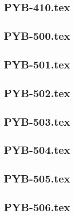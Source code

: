 \renewcommand{\xxexo}{PYB-410.tex} 
\subsection*{\xxexo} 
\graphicspath{{../../exos/python_bases/PYB-410/}}
 
 
\renewcommand{\xxexo}{PYB-500.tex} 
\subsection*{\xxexo} 
\graphicspath{{../../exos/python_bases/PYB-500/}}
 
 
\renewcommand{\xxexo}{PYB-501.tex} 
\subsection*{\xxexo} 
\graphicspath{{../../exos/python_bases/PYB-501/}}
 
 
\renewcommand{\xxexo}{PYB-502.tex} 
\subsection*{\xxexo} 
\graphicspath{{../../exos/python_bases/PYB-502/}}
 
 
\renewcommand{\xxexo}{PYB-503.tex} 
\subsection*{\xxexo} 
\graphicspath{{../../exos/python_bases/PYB-503/}}
 
 
\renewcommand{\xxexo}{PYB-504.tex} 
\subsection*{\xxexo} 
\graphicspath{{../../exos/python_bases/PYB-504/}}
 
 
\renewcommand{\xxexo}{PYB-505.tex} 
\subsection*{\xxexo} 
\graphicspath{{../../exos/python_bases/PYB-505/}}
 
 
\renewcommand{\xxexo}{PYB-506.tex} 
\subsection*{\xxexo} 
\graphicspath{{../../exos/python_bases/PYB-506/}}
 
 
